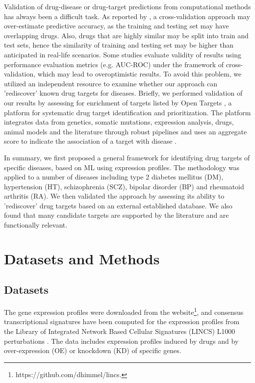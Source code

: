      Validation of drug-disease or drug-target predictions from computational methods has always been a difficult task. As reported by \cite{guney2017reproducible}, a cross-validation approach may over-estimate predictive accuracy, as the training and testing set may have overlapping drugs. Also, drugs that are highly similar may be split into train and test sets, hence the similarity of training and testing set may be higher than anticipated in real-life scenarios. Some studies evaluate validity of results using performance evaluation metrics (e.g. AUC-ROC) under the framework of cross-validation, which may lead to overoptimistic results. To avoid this problem, we utilized an independent resource to examine whether our approach can 'rediscover' known drug targets for diseases. Briefly, we performed validation of our results by assessing for enrichment of targets listed by Open Targets \cite{koscielny2017open}, a platform for systematic drug target identification and prioritization. The platform integrates data from genetics, somatic mutations, expression analysis, drugs, animal models and the literature through robust pipelines and uses an aggregate score to indicate the association of a target with disease \cite{koscielny2017open}.

    In summary, we first proposed a general framework for identifying drug targets of specific diseases, based on ML using expression profiles. The methodology was applied to a number of diseases including type 2 diabetes mellitus (DM), hypertension (HT), schizophrenia (SCZ), bipolar disorder (BP) and  rheumatoid arthritis (RA). We then validated the approach by assessing its ability to 'rediscover' drug targets based on an external established database. We also found that many candidate targets are supported by the literature and are functionally relevant. 

\section{Datasets and Methods}
  \subsection{Datasets}
    The gene expression profiles were downloaded from the website\footnote{https://github.com/dhimmel/lincs.}, and consensus transcriptional signatures have been computed for the expression profiles from the Library of Integrated Network Based Cellular Signatures (LINCS) L1000 perturbations \cite{subramanian2017next}. The data includes expression profiles induced by drugs and by over-expression (OE) or knockdown (KD) of specific genes. 

